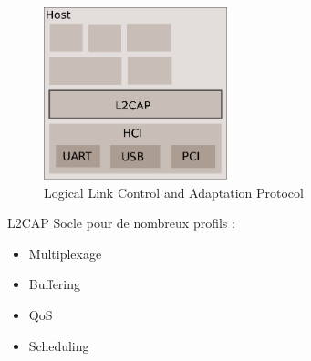 \begin{frame}
\begin{minipage}[t]{0.60\linewidth}
\begin{figure}
\includegraphics[height=5cm]{arch_log_l2cap.png}
\caption{Logical Link Control and Adaptation Protocol}
\end{figure}
\end{minipage}
\begin{minipage}[t]{0.30\linewidth}
	\begin{block}{L2CAP}
		Socle pour de nombreux profils :
		\begin{itemize}
			\item Multiplexage
			\item Buffering
			\item QoS
			\item Scheduling
		\end{itemize}
	\end{block}
\end{minipage}


\end{frame}

